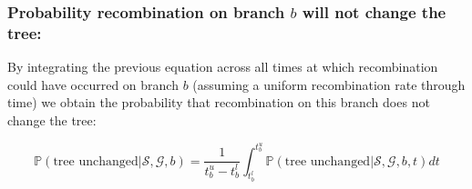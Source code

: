 \documentclass[11pt]{article}
\begin{document}




\subsubsection{Probability recombination on branch $b$ will not change the tree:}
By integrating the previous equation across all times at which recombination could
have occurred on branch $b$ (assuming a uniform recombination rate through time) 
we obtain the probability that recombination on this branch does not change the tree:

\begin{equation*}
	\mathbb{P}(\textrm{tree unchanged} | \mathcal{S},\mathcal{G},b) = 
	\frac{1}{t^u_b-t^l_b} \int_{t_b^l}^{t_b^u} 
	\mathbb{P}(\textrm{tree unchanged} | \mathcal{S},\mathcal{G},b,t)dt
\end{equation*}
\end{document}
